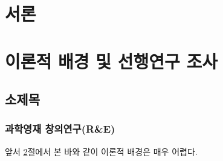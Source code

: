 %
%


\section{서론}

\jiwon[2]


\section{이론적 배경 및 선행연구 조사}\label{sec:search}

\subsection{소제목}
\subsubsection{과학영재 창의연구(R\&E)}

\jiwon[6-7]

앞서 \ref{sec:search}절에서 본 바와 같이 이론적 배경은 매우 어렵다.


